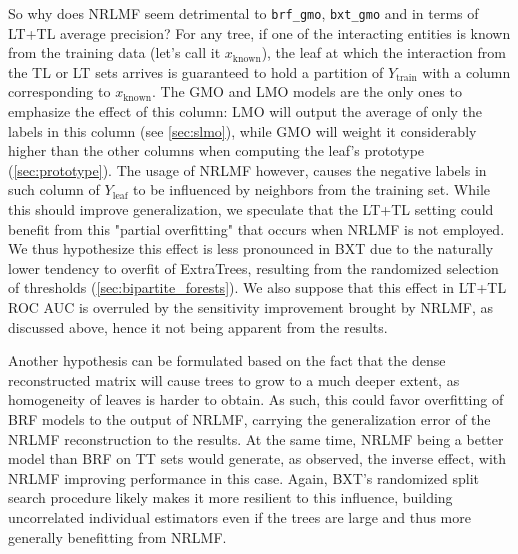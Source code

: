 So why does NRLMF seem detrimental to \texttt{brf\_gmo}, \texttt{bxt\_gmo} and  in terms of LT+TL average precision? For any tree, if one of the interacting entities is known from the training data (let's call it $x_\text{known}$), the leaf at which the interaction from the TL or LT sets arrives is guaranteed to hold a partition of $Y_\text{train}$ with a column corresponding to $x_\text{known}$. The GMO and LMO models are the only ones to emphasize the effect of this column: LMO will output the average of only the labels in this column (see \autoref{sec:slmo}), while GMO will weight it considerably higher than the other columns when computing the leaf's prototype (\autoref{sec:prototype}). The usage of NRLMF however, causes the negative labels in such column of $Y_\text{leaf}$ to be influenced by neighbors from the training set. While this should improve generalization, we speculate that the LT+TL setting could benefit from this "partial overfitting" that occurs when NRLMF is not employed. We thus hypothesize this effect is less pronounced in BXT due to the naturally lower tendency to overfit of ExtraTrees, resulting from the randomized selection of thresholds (\autoref{sec:bipartite_forests}). We also suppose that this effect in LT+TL ROC AUC is overruled by the sensitivity improvement brought by NRLMF, as discussed above, hence it not being apparent from the results.

Another hypothesis can be formulated based on the fact that the dense reconstructed matrix will cause trees to grow to a much deeper extent, as homogeneity of leaves is harder to obtain. As such, this could favor overfitting of BRF models to the output of NRLMF, carrying the generalization error of the NRLMF reconstruction to the results. At the same time, NRLMF being a better model than BRF on TT sets would generate, as observed, the inverse effect, with NRLMF improving performance in this case. %
Again, BXT's randomized split search procedure likely makes it more resilient to this influence, building uncorrelated individual estimators even if the trees are large and thus more generally benefitting from NRLMF.



